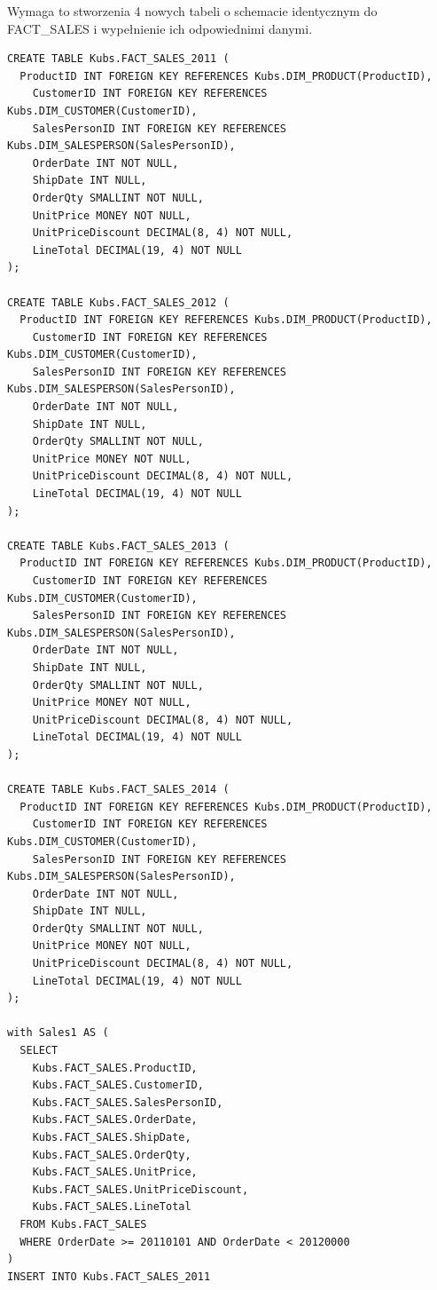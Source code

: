 \documentclass[a4paper,12pt]{article}
\begin{document}
Wymaga to stworzenia 4 nowych tabeli o schemacie identycznym do FACT\_SALES i wypełnienie ich odpowiednimi danymi.

\begin{lstlisting}[caption={Tworzenie i wypełnianie tabeli DIM\_TIME.}, label=lst:zad2_dim_time]
CREATE TABLE Kubs.FACT_SALES_2011 (
  ProductID INT FOREIGN KEY REFERENCES Kubs.DIM_PRODUCT(ProductID),
    CustomerID INT FOREIGN KEY REFERENCES Kubs.DIM_CUSTOMER(CustomerID),
    SalesPersonID INT FOREIGN KEY REFERENCES Kubs.DIM_SALESPERSON(SalesPersonID),
    OrderDate INT NOT NULL,
    ShipDate INT NULL,
    OrderQty SMALLINT NOT NULL,
    UnitPrice MONEY NOT NULL,
    UnitPriceDiscount DECIMAL(8, 4) NOT NULL,
    LineTotal DECIMAL(19, 4) NOT NULL
);

CREATE TABLE Kubs.FACT_SALES_2012 (
  ProductID INT FOREIGN KEY REFERENCES Kubs.DIM_PRODUCT(ProductID),
    CustomerID INT FOREIGN KEY REFERENCES Kubs.DIM_CUSTOMER(CustomerID),
    SalesPersonID INT FOREIGN KEY REFERENCES Kubs.DIM_SALESPERSON(SalesPersonID),
    OrderDate INT NOT NULL,
    ShipDate INT NULL,
    OrderQty SMALLINT NOT NULL,
    UnitPrice MONEY NOT NULL,
    UnitPriceDiscount DECIMAL(8, 4) NOT NULL,
    LineTotal DECIMAL(19, 4) NOT NULL
);

CREATE TABLE Kubs.FACT_SALES_2013 (
  ProductID INT FOREIGN KEY REFERENCES Kubs.DIM_PRODUCT(ProductID),
    CustomerID INT FOREIGN KEY REFERENCES Kubs.DIM_CUSTOMER(CustomerID),
    SalesPersonID INT FOREIGN KEY REFERENCES Kubs.DIM_SALESPERSON(SalesPersonID),
    OrderDate INT NOT NULL,
    ShipDate INT NULL,
    OrderQty SMALLINT NOT NULL,
    UnitPrice MONEY NOT NULL,
    UnitPriceDiscount DECIMAL(8, 4) NOT NULL,
    LineTotal DECIMAL(19, 4) NOT NULL
);

CREATE TABLE Kubs.FACT_SALES_2014 (
  ProductID INT FOREIGN KEY REFERENCES Kubs.DIM_PRODUCT(ProductID),
    CustomerID INT FOREIGN KEY REFERENCES Kubs.DIM_CUSTOMER(CustomerID),
    SalesPersonID INT FOREIGN KEY REFERENCES Kubs.DIM_SALESPERSON(SalesPersonID),
    OrderDate INT NOT NULL,
    ShipDate INT NULL,
    OrderQty SMALLINT NOT NULL,
    UnitPrice MONEY NOT NULL,
    UnitPriceDiscount DECIMAL(8, 4) NOT NULL,
    LineTotal DECIMAL(19, 4) NOT NULL
);

with Sales1 AS (
  SELECT 
    Kubs.FACT_SALES.ProductID,
    Kubs.FACT_SALES.CustomerID,
    Kubs.FACT_SALES.SalesPersonID,
    Kubs.FACT_SALES.OrderDate,
    Kubs.FACT_SALES.ShipDate,
    Kubs.FACT_SALES.OrderQty,
    Kubs.FACT_SALES.UnitPrice,
    Kubs.FACT_SALES.UnitPriceDiscount,
    Kubs.FACT_SALES.LineTotal
  FROM Kubs.FACT_SALES
  WHERE OrderDate >= 20110101 AND OrderDate < 20120000
)
INSERT INTO Kubs.FACT_SALES_2011


\end{lstlisting}
\end{document}
